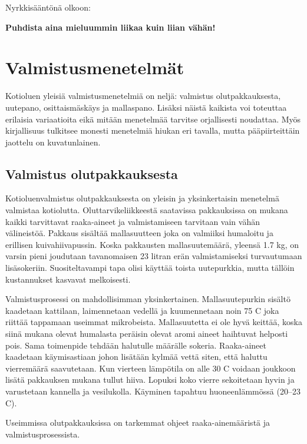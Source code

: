 \documentclass[a4paper,11pt]{report}
\begin{document}
Nyrkkisääntönä olkoon:

\begin{center}
\textbf{Puhdista aina mieluummin liikaa kuin liian vähän!}
\end{center}

\section{Valmistusmenetelmät}

Kotioluen yleisiä valmistusmenetelmiä on neljä: valmistus olutpakkauksesta, uutepano, osittaismäskäys ja mallaspano. Lisäksi näistä kaikista voi toteuttaa erilaisia variaatioita eikä mitään menetelmää tarvitse orjallisesti noudattaa. Myös kirjallisuus tulkitsee monesti menetelmiä hiukan eri tavalla, mutta pääpiirteittäin jaottelu on kuvatunlainen.

\subsection{Valmistus olutpakkauksesta}

Kotioluenvalmistus olutpakkauksesta on yleisin ja yksinkertaisin menetelmä valmistaa kotiolutta. Oluttarvikeliikkeestä saatavissa pakkauksissa on mukana kaikki tarvittavat raaka-aineet ja valmistamiseen tarvitaan vain vähän välineistöä. Pakkaus sisältää mallasuutteen joka on valmiiksi humaloitu ja erillisen kuivahiivapussin. Koska pakkausten mallasuutemäärä, yleensä 1.7 kg, on varsin pieni joudutaan tavanomaisen 23 litran erän valmistamiseksi turvautumaan lisäsokeriin. Suositeltavampi tapa olisi käyttää toista uutepurkkia, mutta tällöin kustannukset kasvavat melkoisesti.

Valmistusprosessi on mahdollisimman yksinkertainen. Mallasuutepurkin sisältö kaadetaan kattilaan, laimennetaan vedellä ja kuumennetaan noin 75 \degree C joka riittää tappamaan useimmat mikrobeista. Mallasuutetta ei ole hyvä keittää, koska siinä mukana olevat humalasta peräisin olevat aromi aineet haihtuvat helposti pois. Sama toimenpide tehdään halutulle määrälle sokeria. Raaka-aineet kaadetaan käymisastiaan johon lisätään kylmää vettä siten, että haluttu vierremäärä saavutetaan. Kun vierteen lämpötila on alle 30 \degree C voidaan joukkoon lisätä pakkauksen mukana tullut hiiva. Lopuksi koko vierre sekoitetaan hyvin ja varustetaan kannella ja vesilukolla. Käyminen tapahtuu huoneenlämmössä (20--23 \degree C).

Useimmissa olutpakkauksissa on tarkemmat ohjeet raaka-ainemääristä ja valmistusprosessista.
\end{document}
